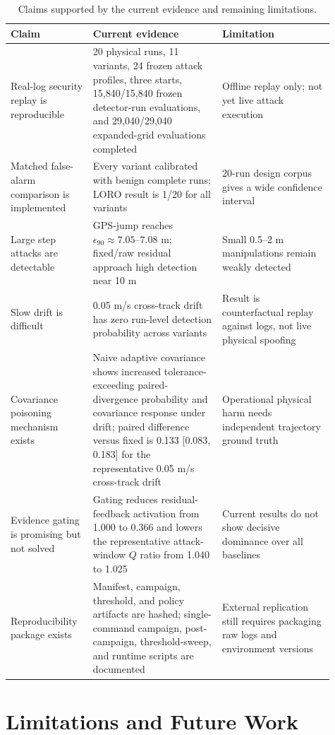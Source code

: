 \documentclass[conference]{IEEEtran}
\begin{document}
\begin{table}[t]
\centering
\caption{Claims supported by the current evidence and remaining limitations.}
\label{tab:claims_evidence}
\scriptsize
\begin{tabular}{L{0.22\linewidth} L{0.37\linewidth} L{0.32\linewidth}}
\toprule
\textbf{Claim} & \textbf{Current evidence} & \textbf{Limitation} \\
\midrule
Real-log security replay is reproducible &
20 physical runs, 11 variants, 24 frozen attack profiles, three starts,
15,840/15,840 frozen detector-run evaluations, and 29,040/29,040 expanded-grid
evaluations completed &
Offline replay only; not yet live attack execution \\
Matched false-alarm comparison is implemented &
Every variant calibrated with benign complete runs; LORO result is 1/20 for
all variants &
20-run design corpus gives a wide confidence interval \\
Large step attacks are detectable &
GPS-jump reaches $\epsilon_{90}\approx7.05$--$7.08$ m; fixed/raw residual
approach high detection near 10 m &
Small 0.5--2 m manipulations remain weakly detected \\
Slow drift is difficult &
0.05 m/s cross-track drift has zero run-level detection probability across
variants &
Result is counterfactual replay against logs, not live physical spoofing \\
Covariance poisoning mechanism exists &
Naive adaptive covariance shows increased tolerance-exceeding paired-divergence probability
and covariance response under drift; paired difference versus fixed is 0.133
[0.083, 0.183] for the representative 0.05 m/s cross-track drift &
Operational physical harm needs independent trajectory ground truth \\
Evidence gating is promising but not solved &
Gating reduces residual-feedback activation from 1.000 to 0.366 and lowers the
representative attack-window $Q$ ratio from 1.040 to 1.025 &
Current results do not show decisive dominance over all baselines \\
Reproducibility package exists &
Manifest, campaign, threshold, and policy artifacts are hashed; single-command
campaign, post-campaign, threshold-sweep, and runtime scripts are documented &
External replication still requires packaging raw logs and environment versions \\
\bottomrule
\end{tabular}
\end{table}

\section{Limitations and Future Work}
\label{sec:limitations}
\end{document}
